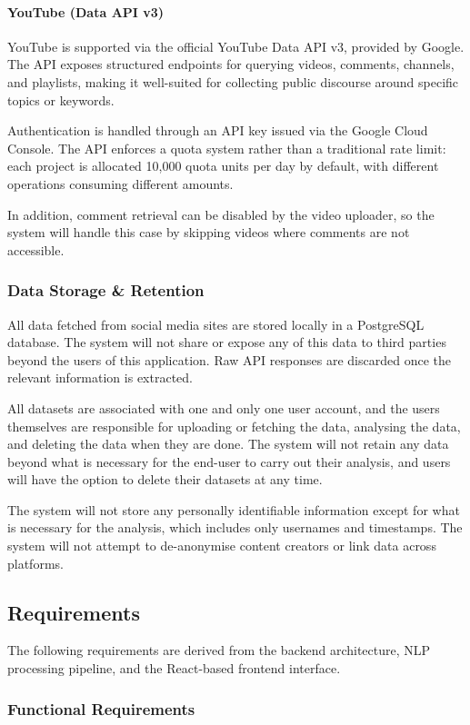 \documentclass[12pt, a4paper]{article}
\begin{document}
\paragraph{YouTube (Data API v3)}
YouTube is supported via the official YouTube Data API v3, provided by Google. The API exposes structured endpoints for querying videos, comments, channels, and playlists, making it well-suited for collecting public discourse around specific topics or keywords.

Authentication is handled through an API key issued via the Google Cloud Console. The API enforces a quota system rather than a traditional rate limit: each project is allocated 10,000 quota units per day by default, with different operations consuming different amounts.

In addition, comment retrieval can be disabled by the video uploader, so the system will handle this case by skipping videos where comments are not accessible.

\subsubsection{Data Storage \& Retention}
All data fetched from social media sites are stored locally in a PostgreSQL database. The system will not share or expose any of this data to third parties beyond the users of this application. Raw API responses are discarded once the relevant information is extracted. 

All datasets are associated with one and only one user account, and the users themselves are responsible for uploading or fetching the data, analysing the data, and deleting the data when they are done. The system will not retain any data beyond what is necessary for the end-user to carry out their analysis, and users will have the option to delete their datasets at any time.

The system will not store any personally identifiable information except for what is necessary for the analysis, which includes only usernames and timestamps. The system will not attempt to de-anonymise content creators or link data across platforms.

\subsection{Requirements}
The following requirements are derived from the backend architecture, NLP processing pipeline, and the React-based frontend interface.

\subsubsection{Functional Requirements}
\end{document}
